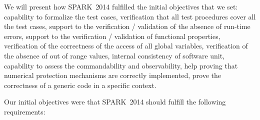 \documentclass[10pt,a4paper,twocolumn]{article}
\newcommand{\newspark}{SPARK~2014\xspace}
\begin{document}
\ifdefined\abstractonly
We will present how \newspark fulfilled the initial objectives that we set:
capability to formalize the test cases, verification that all test procedures
cover all the test cases, support to the verification / validation of the
absence of run-time errors, support to the verification / validation of
functional properties, verification of the correctness of the access of all
global variables, verification of the absence of out of range values, internal
consistency of software unit, capability to assess the commandability and
observability, help proving that numerical protection mechanisms are correctly
implemented, prove the correctness of a generic code in a specific context.

\else
Our initial objectives were that \newspark should fulfill the following requirements:
\end{document}
